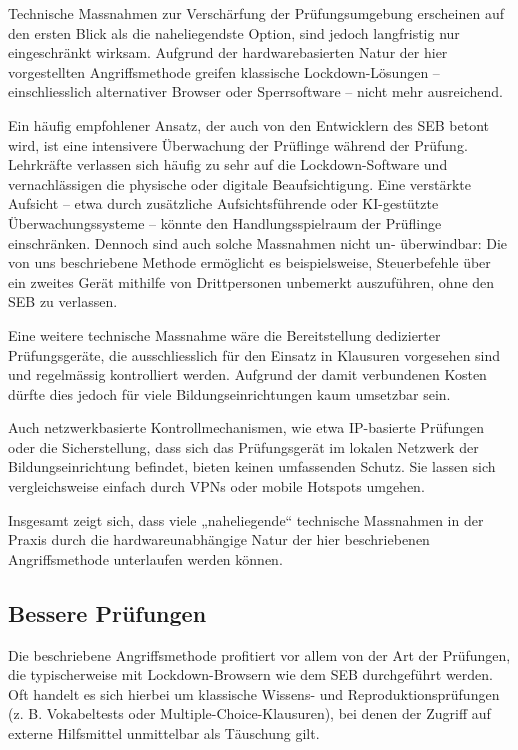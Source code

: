 \documentclass[14pt]{article}
\begin{document}
Technische Massnahmen zur Verschärfung der Prüfungsumgebung erscheinen auf den ersten Blick als die naheliegendste Option, sind jedoch langfristig nur eingeschränkt wirksam. Aufgrund der hardwarebasierten Natur der hier vorgestellten Angriffsmethode greifen klassische Lockdown-Lösungen – einschliesslich alternativer Browser oder Sperrsoftware – nicht mehr ausreichend.

Ein häufig empfohlener Ansatz, der auch von den Entwicklern des SEB betont wird, ist eine intensivere Überwachung der Prüflinge während der Prüfung. Lehrkräfte verlassen sich häufig zu sehr auf die Lockdown-Software und vernachlässigen die physische oder digitale Beaufsichtigung. Eine verstärkte Aufsicht – etwa durch zusätzliche Aufsichtsführende oder KI-gestützte Überwachungssysteme – könnte den Handlungsspielraum der Prüflinge einschränken. Dennoch sind auch solche Massnahmen nicht un- überwindbar: Die von uns beschriebene Methode ermöglicht es beispielsweise, Steuerbefehle über ein zweites Gerät mithilfe von Drittpersonen unbemerkt auszuführen, ohne den SEB zu verlassen.

Eine weitere technische Massnahme wäre die Bereitstellung dedizierter Prüfungsgeräte, die ausschliesslich für den Einsatz in Klausuren vorgesehen sind und regelmässig kontrolliert werden. Aufgrund der damit verbundenen Kosten dürfte dies jedoch für viele Bildungseinrichtungen kaum umsetzbar sein.

Auch netzwerkbasierte Kontrollmechanismen, wie etwa IP-basierte Prüfungen oder die Sicherstellung, dass sich das Prüfungsgerät im lokalen Netzwerk der Bildungseinrichtung befindet, bieten keinen umfassenden Schutz. Sie lassen sich vergleichsweise einfach durch VPNs oder mobile Hotspots umgehen.

Insgesamt zeigt sich, dass viele „naheliegende“ technische Massnahmen in der Praxis durch die hardwareunabhängige Natur der hier beschriebenen Angriffsmethode unterlaufen werden können.

\subsection{Bessere Prüfungen}

Die beschriebene Angriffsmethode profitiert vor allem von der Art der Prüfungen, die typischerweise mit Lockdown-Browsern wie dem SEB durchgeführt werden. Oft handelt es sich hierbei um klassische Wissens- und Reproduktionsprüfungen (z. B. Vokabeltests oder Multiple-Choice-Klausuren), bei denen der Zugriff auf externe Hilfsmittel unmittelbar als Täuschung gilt.
\end{document}
